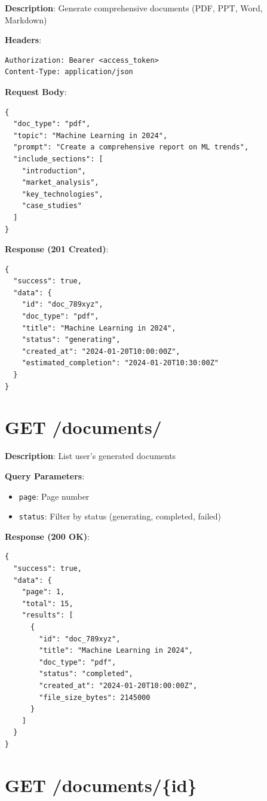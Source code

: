 \documentclass[12pt,a4paper]{report}
\begin{document}
\textbf{Description}: Generate comprehensive documents (PDF, PPT, Word, Markdown)

\textbf{Headers}:
\begin{lstlisting}
Authorization: Bearer <access_token>
Content-Type: application/json
\end{lstlisting}

\textbf{Request Body}:
\begin{lstlisting}
{
  "doc_type": "pdf",
  "topic": "Machine Learning in 2024",
  "prompt": "Create a comprehensive report on ML trends",
  "include_sections": [
    "introduction",
    "market_analysis",
    "key_technologies",
    "case_studies"
  ]
}
\end{lstlisting}

\textbf{Response (201 Created)}:
\begin{lstlisting}
{
  "success": true,
  "data": {
    "id": "doc_789xyz",
    "doc_type": "pdf",
    "title": "Machine Learning in 2024",
    "status": "generating",
    "created_at": "2024-01-20T10:00:00Z",
    "estimated_completion": "2024-01-20T10:30:00Z"
  }
}
\end{lstlisting}

\section{GET /documents/}

\textbf{Description}: List user's generated documents

\textbf{Query Parameters}:
\begin{itemize}
    \item \texttt{page}: Page number
    \item \texttt{status}: Filter by status (generating, completed, failed)
\end{itemize}

\textbf{Response (200 OK)}:
\begin{lstlisting}
{
  "success": true,
  "data": {
    "page": 1,
    "total": 15,
    "results": [
      {
        "id": "doc_789xyz",
        "title": "Machine Learning in 2024",
        "doc_type": "pdf",
        "status": "completed",
        "created_at": "2024-01-20T10:00:00Z",
        "file_size_bytes": 2145000
      }
    ]
  }
}
\end{lstlisting}

\section{GET /documents/\{id\}}
\end{document}
